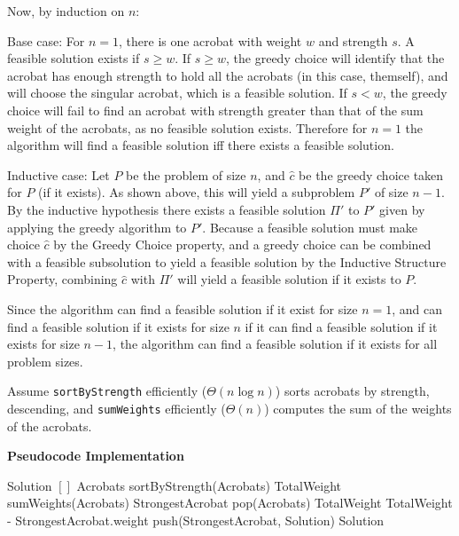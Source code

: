 \documentclass[11pt]{article}
\begin{document}
Now, by induction on $n$: 

Base case: For $n=1$, there is one acrobat with weight $w$ and strength $s$. A feasible solution exists if $s \geq w$. If $s \geq w$, the greedy choice will identify that the acrobat has enough strength to hold all the acrobats (in this case, themself), and will choose the singular acrobat, which is a feasible solution. If $s < w$, the greedy choice will fail to find an acrobat with strength greater than that of the sum weight of the acrobats, as no feasible solution exists. Therefore for $n=1$ the algorithm will find a feasible solution iff there exists a feasible solution.

Inductive case: Let $P$ be the problem of size $n$, and $\hat{c}$ be the greedy choice taken for $P$ (if it exists). As shown above, this will yield a subproblem $P'$ of size $n-1$. By the inductive hypothesis there exists a feasible solution $\Pi'$ to $P'$ given by applying the greedy algorithm to $P'$. Because a feasible solution must make choice $\hat{c}$ by the Greedy Choice property, and a greedy choice can be combined with a feasible subsolution to yield a feasible solution by the Inductive Structure Property, combining $\hat{c}$ with $\Pi'$ will yield a feasible solution if it exists to $P$. 

Since the algorithm can find a feasible solution if it exist for size $n=1$, and can find a feasible solution if it exists for size $n$ if it can find a feasible solution if it exists for size $n-1$, the algorithm can find a feasible solution if it exists for all problem sizes. 

Assume \texttt{sortByStrength} efficiently ($\Theta(n\log n)$) sorts acrobats by strength, descending, and \texttt{sumWeights} efficiently ($\Theta(n)$) computes the sum of the weights of the acrobats.

\textbf{Pseudocode Implementation}

\begin{algorithm}[H]
\begin{algorithmic}
\State Solution \gets $[]$
\State Acrobats \gets sortByStrength(Acrobats) 
\State TotalWeight \gets sumWeights(Acrobats)
    \State StrongestAcrobat \gets pop(Acrobats) 
        \State TotalWeight \gets TotalWeight - StrongestAcrobat.weight
        \State push(StrongestAcrobat, Solution) 
    \Else  
        \State {} 
    \EndIf
\EndFor
\State \Return Solution
\end{algorithmic}
\end{algorithm}
\end{document}
